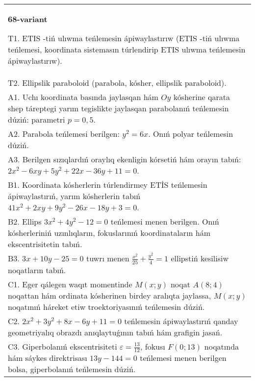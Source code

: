 \documentclass{article}
\begin{document}
\begin{tabular}{m{17cm}}
\textbf{68-variant}
\newline

T1. ETIS -tiń ulıwma teńlemesin ápiwaylastırıw (ETIS -tiń ulıwma teńlemesi, koordinata sistemasın túrlendirip ETIS ulıwma teńlemesin ápiwaylastırıw).\\

T2. Ellipslik paraboloid (parabola, kósher, ellipslik paraboloid).\\

A1. Uchı koordinata basında jaylasqan hám $Oy$ kósherine qarata shep táreptegi yarım tegislikte jaylasqan parabolanıń teńlemesin dúziń: parametri $p=0,5$.\\

A2. Parabola teńlemesi berilgen: $y^2=6 x$. Onıń polyar teńlemesin dúziń.\\

A3. Berilgen sızıqlardıń oraylıq ekenligin kórsetiń hám orayın tabıń: $2 x^{2}-6 xy+5 y^{2}+22 x-36 y+11=0$.\\

B1. Koordinata kósherlerin túrlendirmey ETİS teńlemesin ápiwaylastırıń, yarım kósherlerin tabıń $41x^{2} + 2xy + 9y^{2} - 26x - 18y + 3 = 0$.  \\

B2. Ellips $3x^{2} + 4y^{2} - 12 = 0$ teńlemesi menen berilgen. Onıń kósherleriniń uzınlıqların, fokuslarınıń koordinataların hám ekscentrisitetin tabıń.  \\

B3. $3x + 10y - 25 = 0$ tuwrı menen $\frac{x^{2}}{25} + \frac{y^{2}}{4} = 1$ ellipstiń kesilisiw noqatların tabıń.\\

C1. Eger qálegen waqıt momentinde $M(x;y)$ noqat $A(8;4)$ noqattan hám ordinata kósherinen birdey aralıqta jaylassa, $M(x;y)$ noqatınıń háreket etiw troektoriyasınıń teńlemesin dúziń.  \\

C2. $2x^{2} + 3y^{2} + 8x - 6y + 11 = 0$ teńlemesin ápiwaylastırıń qanday geometriyalıq obrazdı anıqlaytuǵının tabıń hám grafigin jasań.\\

C3. Giperbolanıń ekscentrisiteti $\varepsilon = \frac{13}{12}$, fokusı $F(0;13)$ noqatında hám sáykes direktrisası $13y - 144 = 0$ teńlemesi menen berilgen bolsa, giperbolanıń teńlemesin dúziń.  \\

\end{tabular}
\vspace{1cm}
\end{document}
